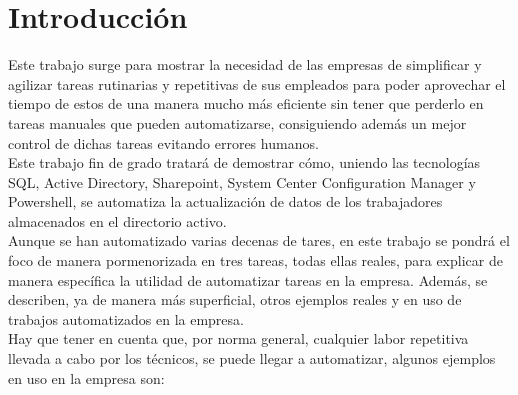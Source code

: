 \documentclass[a4paper, 12pt]{book}
\begin{document}
\tableofcontents 
\cleardoublepage
\listoffigures %



\cleardoublepage
\chapter{Introducción}
\label{sec:intro} %

Este trabajo surge para mostrar la necesidad de las empresas de simplificar y agilizar tareas rutinarias y repetitivas de sus empleados para poder aprovechar el tiempo de estos de una manera mucho más eficiente sin tener que perderlo en tareas manuales que pueden automatizarse, consiguiendo además un mejor control de dichas tareas evitando errores humanos.
\\

Este trabajo fin de grado tratará de demostrar cómo, uniendo las tecnologías SQL, Active Directory, Sharepoint, System Center Configuration Manager y Powershell, se automatiza la actualización de datos de los trabajadores almacenados en el directorio activo.
\\

Aunque se han automatizado varias decenas de tares, en este trabajo se pondrá el foco de manera pormenorizada en tres tareas, todas ellas reales, para explicar de manera específica la utilidad de automatizar tareas en la empresa. Además, se describen, ya de manera más superficial, otros ejemplos reales y en uso de trabajos automatizados en la empresa. 
\\

Hay que tener en cuenta que, por norma general, cualquier labor repetitiva llevada a cabo por los técnicos, se puede llegar a automatizar, algunos ejemplos en uso en la empresa son:
\end{document}
